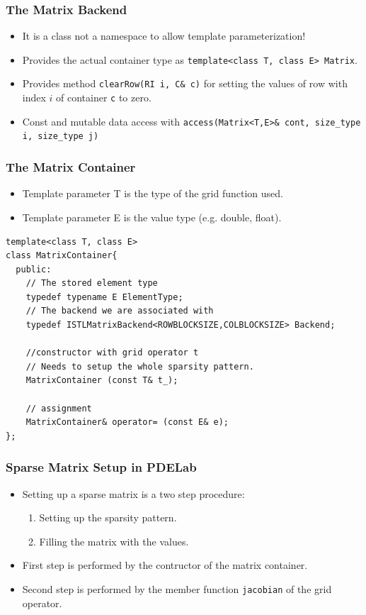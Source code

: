 \begin{frame}
  \frametitle<presentation>{The Matrix Backend}
  \begin{itemize}
  \item It is a class not a namespace to allow template
    parameterization!
  \item Provides the actual container type as
    \lstinline!template<class T, class E> Matrix!.
  \item Provides method \lstinline!clearRow(RI i, C& c)! for setting
    the values of row with index $i$ of container \lstinline!c! to
    zero.
    \item Const and mutable data access with
    \lstinline!access(Matrix<T,E>& cont, size_type i, size_type j)!
  \end{itemize}
\end{frame}

\begin{frame}[fragile]
  \frametitle{The Matrix Container}
\begin{itemize}
  \item Template parameter T is the type of the grid function used.
  \item Template parameter E is the value type (e.g. double, float).
  \end{itemize}
  \begin{lstlisting}[basicstyle=\scriptsize]
template<class T, class E>
class MatrixContainer{
  public:
    // The stored element type
    typedef typename E ElementType;
    // The backend we are associated with
    typedef ISTLMatrixBackend<ROWBLOCKSIZE,COLBLOCKSIZE> Backend;

    //constructor with grid operator t
    // Needs to setup the whole sparsity pattern.
    MatrixContainer (const T& t_);

    // assignment
    MatrixContainer& operator= (const E& e);
};
  \end{lstlisting}
\end{frame}
\begin{frame}[fragile]
  \frametitle{Sparse Matrix Setup in PDELab}
  \begin{itemize}
  \item Setting up a sparse matrix is a two step procedure:
    \begin{enumerate}
    \item Setting up the sparsity pattern.
    \item Filling the matrix with the values.
    \end{enumerate}
  \item First step is performed by the contructor of the matrix
    container.
  \item Second step is performed by the member function
    \lstinline!jacobian! of the grid operator.
  \end{itemize}

\end{frame}


